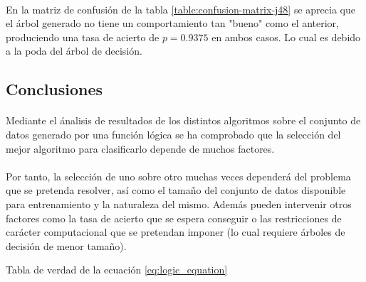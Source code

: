 \documentclass[10pt, a4paper,spanish]{article}
\begin{document}
			\paragraph{}
			En la matriz de confusión de la tabla \ref{table:confusion-matrix-j48} se aprecia que el árbol generado no tiene un comportamiento tan "bueno" como el anterior, produciendo una tasa de acierto de $p = 0.9375$ en ambos casos. Lo cual es debido a la poda del árbol de decisión.


		\subsection{Conclusiones}

			\paragraph{}
			Mediante el ánalisis de resultados de los distintos algoritmos sobre el conjunto de datos generado por una función lógica se ha comprobado que la selección del mejor algoritmo para clasificarlo depende de muchos factores.

			\paragraph{}
			Por tanto, la selección de uno sobre otro muchas veces dependerá del problema que se pretenda resolver, así como el tamaño del conjunto de datos disponible para entrenamiento y la naturaleza del mismo. Además pueden intervenir otros factores como la tasa de acierto que se espera conseguir o las restricciones de carácter computacional que se pretendan imponer (lo cual requiere árboles de decisión de menor tamaño).



			\begin{table}[p]
				\begin{center}
				\end{center}
				\caption{Tabla de verdad de la ecuación \ref{eq:logic_equation}}
				\label{eq:truth_table}
			\end{table}


	\nocite{subject:taa}
  
  
\end{document}
